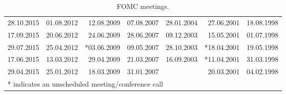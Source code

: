 \documentclass[11pt,a4paper,english,oneside]{book}
\numberwithin{equation}{chapter}
\begin{document}
\begin{table}[h]
\begin{tabular}{r r r r r r r }
						28.10.2015 & 01.08.2012 & 12.08.2009 & 07.08.2007 & 28.01.2004 & 27.06.2001 & 18.08.1998 \\
						17.09.2015 & 20.06.2012 & 24.06.2009 & 28.06.2007 & 09.12.2003 & 15.05.2001 & 01.07.1998 \\
						29.07.2015 & 25.04.2012 & *03.06.2009 & 09.05.2007 & 28.10.2003 & *18.04.2001 & 19.05.1998 \\
						17.06.2015 & 13.03.2012 & 29.04.2009 & 21.03.2007 & 16.09.2003 & *11.04.2001 & 31.03.1998 \\
						29.04.2015 & 25.01.2012 & 18.03.2009 & 31.01.2007 &  & 20.03.2001 & 04.02.1998 \\
						\midrule																
						\multicolumn{6}{l}{* indicates an unscheduled meeting/conference call} & \\
		\bottomrule %
	\end{tabular}
	\caption{FOMC meetings.} %
	\label{tab:meetings} %
\end{table}




\newpage
\thispagestyle{empty}
\end{document}
